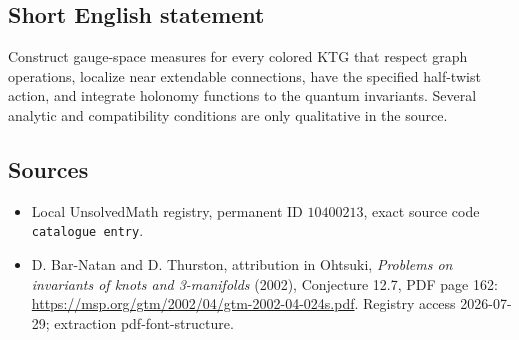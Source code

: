 \documentclass[11pt]{article}
\begin{document}
\subsection{Short English statement}
Construct gauge-space measures for every colored KTG that respect graph operations, localize near extendable connections, have the specified half-twist action, and integrate holonomy functions to the quantum invariants. Several analytic and compatibility conditions are only qualitative in the source.
\subsection{Sources}
\begin{itemize}
\item Local UnsolvedMath registry, permanent ID \(10400213\), exact source code \texttt{catalogue entry}.
\item D. Bar-Natan and D. Thurston, attribution in Ohtsuki, \emph{Problems on invariants of knots and 3-manifolds} (2002), Conjecture 12.7, PDF page 162: \url{https://msp.org/gtm/2002/04/gtm-2002-04-024s.pdf}. Registry access 2026-07-29; extraction pdf-font-structure.
\end{itemize}
\end{document}
